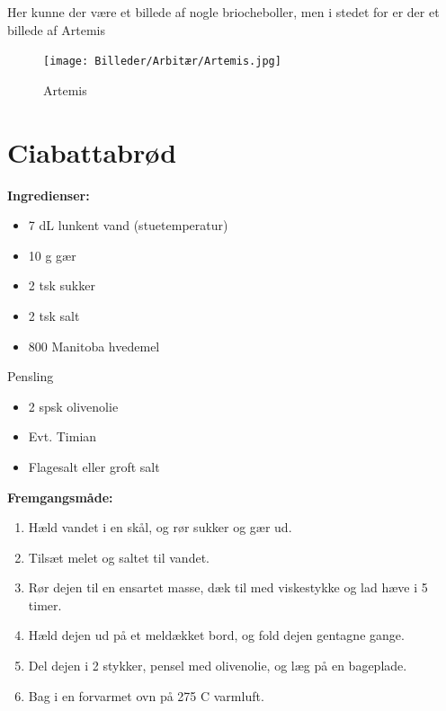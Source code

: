 \documentclass{book}
\begin{document}
\newpage Her kunne der være et billede af nogle briocheboller, men i stedet for er der et billede af Artemis
\begin{figure}
    \centering
    \texttt{[image: Billeder/Arbitær/Artemis.jpg]}
    \caption{Artemis}
\end{figure}
\newpage \section{Ciabattabrød}
\begin{minipage}[t]{0.5\textwidth}
\textbf{Ingredienser:}
\begin{itemize}
    \item 7 dL lunkent vand (stuetemperatur)
    \item 10 g gær
    \item 2 tsk sukker
    \item 2 tsk salt
    \item 800 Manitoba hvedemel
\end{itemize}
Pensling
\begin{itemize}
    \item 2 spsk olivenolie
    \item Evt. Timian
    \item Flagesalt eller groft salt
\end{itemize}
\end{minipage}
\begin{minipage}[t]{0.5\textwidth}
\textbf{Fremgangsmåde:}
\begin{enumerate}
    \item Hæld vandet i en skål, og rør sukker og gær ud.
    \item Tilsæt melet og saltet til vandet.
    \item Rør dejen til en ensartet masse, dæk til med viskestykke og lad hæve i 5 timer.
    \item Hæld dejen ud på et meldækket bord, og fold dejen gentagne gange.
    \item Del dejen i 2 stykker, pensel med olivenolie, og læg på en bageplade.
    \item Bag i en forvarmet ovn på 275 \degree C varmluft.
\end{enumerate}
\end{minipage}
\newpage {}
\end{document}
